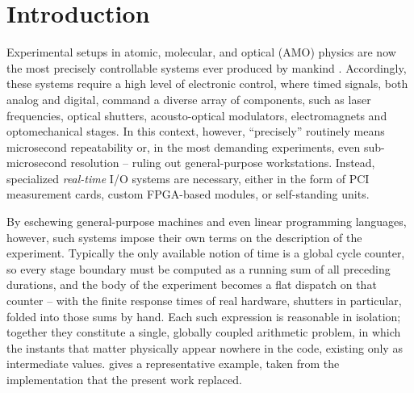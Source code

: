 \documentclass{SciPost}
\begin{document}
 
 
\section{Introduction}
\label{sec:intro}
Experimental setups in atomic, molecular, and optical (AMO) physics are now the most precisely controllable systems ever produced by mankind \cite{PhysRevLett.132.190001,Bluvstein2024}. Accordingly, these systems require a high level of electronic control, where timed signals, both analog and digital, command a diverse array of components, such as laser frequencies, optical shutters, acousto-optical modulators, electromagnets and optomechanical stages. In this context, however, “precisely” routinely means microsecond repeatability or, in the most demanding experiments, even sub-microsecond resolution – ruling out general-purpose workstations. Instead, specialized \emph{real-time} I/O systems are necessary, either in the form of PCI measurement cards, custom FPGA-based modules, or self-standing units.
 
By eschewing general-purpose machines and even linear programming languages,
however, such systems impose their own terms on the description of the experiment.
Typically the only available notion of time is a global cycle counter, so every
stage boundary must be computed as a running sum of all preceding durations, and
the body of the experiment becomes a flat dispatch on that counter – with the
finite response times of real hardware, shutters in particular, folded into those
sums by hand. Each such expression is reasonable in isolation; together they
constitute a single, globally coupled arithmetic problem, in which the instants
that matter physically appear nowhere in the code, existing only as intermediate
values.  gives a representative example, taken from the
implementation that the present work replaced.%
 
\end{document}
